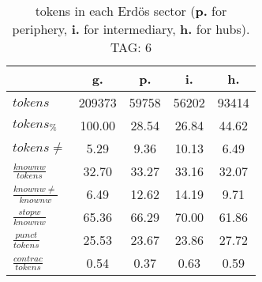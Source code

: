 \begin{table}[h!]
\begin{center}
\begin{tabular}{| l | c | c | c | c |}\hline
 & g. & p. & i. & h. \\\hline
$tokens$ & 209373  & 59758  & 56202  & 93414 \\\hline
$tokens_{\%}$ & 100.00  & 28.54  & 26.84  & 44.62 \\\hline
$tokens \neq$ & 5.29  & 9.36  & 10.13  & 6.49 \\\hline
$\frac{knownw}{tokens}$ & 32.70  & 33.27  & 33.16  & 32.07 \\\hline
$\frac{knownw \neq}{knownw}$ & 6.49  & 12.62  & 14.19  & 9.71 \\\hline
$\frac{stopw}{knownw}$ & 65.36  & 66.29  & 70.00  & 61.86 \\\hline
$\frac{punct}{tokens}$ & 25.53  & 23.67  & 23.86  & 27.72 \\\hline
$\frac{contrac}{tokens}$ & 0.54  & 0.37  & 0.63  & 0.59 \\\hline
\end{tabular}
\caption{tokens in each Erd\"os sector ({{\bf p.}} for periphery, {{\bf i.}} for intermediary, 
    {{\bf h.}} for hubs). TAG: 6}
\end{center}
\end{table}
